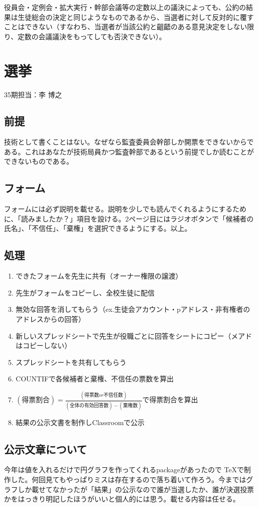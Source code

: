 \documentclass[dvipdfmx,jb5]{jreport}
\begin{document}
役員会・定例会・拡大実行・幹部会議等の定数以上の議決によっても、公約の結果は生徒総会の決定と同じようなものであるから、当選者に対して反対的に覆すことはできない（すなわち、当選者が当該公約と齟齬のある意見決定をしない限り、定数の会議議決をもってしても否決できない）。
\section{選挙}
35期担当：李 博之
\subsection{前提}
技術として書くことはない。なぜなら監査委員会幹部しか開票をできないからである。これはあなたが技術局員かつ監査幹部であるという前提でしか読むことができないものである。
\subsection{フォーム}
フォームには必ず説明を載せる。説明を少しでも読んでくれるようにするために、「読みましたか？」項目を設ける。2ページ目にはラジオボタンで「候補者の氏名」、「不信任」、「棄権」を選択できるようにする。以上。
\subsection{処理}
\begin{enumerate}
      \item できたフォームを先生に共有（オーナー権限の譲渡）
      \item 先生がフォームをコピーし、全校生徒に配信
      \item 無効な回答を消してもらう（ex.生徒会アカウント・pアドレス・非有権者のアドレスからの回答）
      \item 新しいスプレッドシートで先生が役職ごとに回答をシートにコピー（メアドはコピーしない）
      \item スプレッドシートを共有してもらう
      \item COUNTIFで各候補者と棄権、不信任の票数を算出
      \item $(得票割合)=\frac{(得票数or不信任数)}{(全体の有効回答数) - (棄権数)}$で得票割合を算出
      \item 結果の公示文書を制作しClassroomで公示
\end{enumerate}
\subsection{公示文章について}
今年は値を入れるだけで円グラフを作ってくれるpackageがあったので \TeX で制作した。何回見てもやっぱりミスは存在するので落ち着いて作ろう。今まではグラフしか載せてなかったが「結果」の公示なので誰が当選したか、誰が決選投票かをはっきり明記したほうがいいと個人的には思う。載せる内容は任せる。
\end{document}
